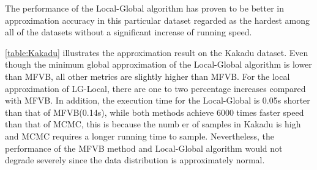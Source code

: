 The performance of the Local-Global algorithm has proven to be better in approximation accuracy in this particular dataset regarded as the hardest among all of the datasets without a significant increase of running speed.\\
\begin{table}[!h]
	\caption{Experiment Result on Kakadu dataset}
	\label{table:Kakadu}
\end{table}
\autoref{table:Kakadu} illustrates the approximation result on the Kakadu dataset. Even though the minimum global approximation of the Local-Global algorithm is lower than MFVB, all other metrics are slightly higher than MFVB. For the local approximation of LG-Local, there are one to two percentage increases compared with MFVB. In addition, the execution time for the Local-Global is 0.05s shorter than that of MFVB(0.14s), while both methods achieve 6000 times faster speed than that of MCMC, this is because the numb er of samples in Kakadu is high and MCMC requires a longer running time to sample. Nevertheless, the performance of the MFVB method and Local-Global algorithm would not degrade severely since the data distribution is approximately normal.\\
\begin{table}[!h]
	\caption{Experiment Result on bodyfat dataset}
	\label{table:bodyfat}
\end{table}
